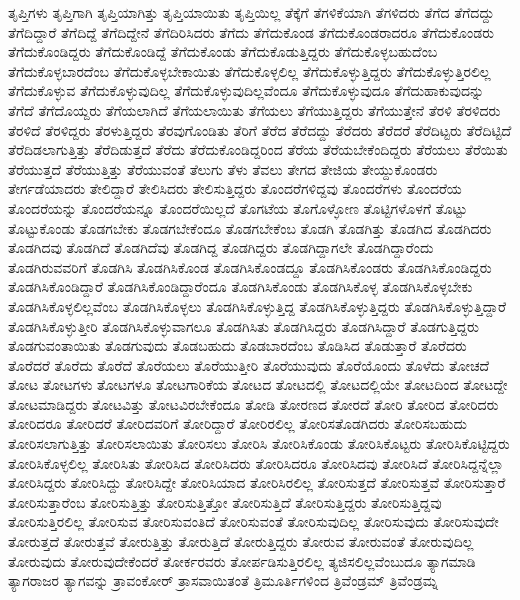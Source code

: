 {ತೃಪ್ತಿಗಳು
ತೃಪ್ತಿಗಾಗಿ
ತೃಪ್ತಿಯಾಗಿತ್ತು
ತೃಪ್ತಿಯಾಯಿತು
ತೃಪ್ತಿಯಿಲ್ಲ
ತೆಕ್ಕೆಗೆ
ತೆಗಳಿಕೆಯಾಗಿ
ತೆಗಳಿದರು
ತೆಗೆದ
ತೆಗೆದದ್ದು
ತೆಗೆದಿದ್ದಾರೆ
ತೆಗೆದಿದ್ದೆ
ತೆಗೆದಿದ್ದೇನೆ
ತೆಗೆದಿರಿಸಿದರು
ತೆಗೆದು
ತೆಗೆದುಕೊಂಡ
ತೆಗೆದುಕೊಂಡರಾದರೂ
ತೆಗೆದುಕೊಂಡರು
ತೆಗೆದುಕೊಂಡಿದ್ದರು
ತೆಗೆದುಕೊಂಡಿದ್ದೆ
ತೆಗೆದುಕೊಂಡು
ತೆಗೆದುಕೊಡುತ್ತಿದ್ದರು
ತೆಗೆದುಕೊಳ್ಳಬಹುದೆಂಬ
ತೆಗೆದುಕೊಳ್ಳಬಾರದೆಂಬ
ತೆಗೆದುಕೊಳ್ಳಬೇಕಾಯಿತು
ತೆಗೆದುಕೊಳ್ಳಲಿಲ್ಲ
ತೆಗೆದುಕೊಳ್ಳುತ್ತಿದ್ದರು
ತೆಗೆದುಕೊಳ್ಳುತ್ತಿರಲಿಲ್ಲ
ತೆಗೆದುಕೊಳ್ಳುವ
ತೆಗೆದುಕೊಳ್ಳುವುದಿಲ್ಲ
ತೆಗೆದುಕೊಳ್ಳುವುದಿಲ್ಲವೆಂದೂ
ತೆಗೆದುಕೊಳ್ಳುವುದೂ
ತೆಗೆದುಹಾಕುವುದನ್ನು
ತೆಗೆದೆ
ತೆಗೆದೊಯ್ದರು
ತೆಗೆಯಲಾಗಿದೆ
ತೆಗೆಯಲಾಯಿತು
ತೆಗೆಯಲು
ತೆಗೆಯುತ್ತಿದ್ದರು
ತೆಗೆಯುತ್ತೇನೆ
ತೆರಳಿ
ತೆರಳಿದರು
ತೆರಳಿದೆ
ತೆರಳಿದ್ದರು
ತೆರಳುತ್ತಿದ್ದರು
ತೆರವುಗೊಂಡಿತು
ತೆರಿಗೆ
ತೆರೆದ
ತೆರೆದದ್ದು
ತೆರೆದರು
ತೆರೆದರೆ
ತೆರೆದಿಟ್ಟರು
ತೆರೆದಿಟ್ಟಿದೆ
ತೆರೆದಿಡಲಾಗುತ್ತಿತ್ತು
ತೆರೆದಿಡುತ್ತದೆ
ತೆರೆದು
ತೆರೆದುಕೊಂಡಿದ್ದರಿಂದ
ತೆರೆಯ
ತೆರೆಯಬೇಕೆಂದಿದ್ದರು
ತೆರೆಯಲು
ತೆರೆಯಿತು
ತೆರೆಯುತ್ತದೆ
ತೆರೆಯುತ್ತಿತ್ತು
ತೆರೆಯುವಂತೆ
ತೆಲುಗು
ತೆಳು
ತೆವಲು
ತೇಗದ
ತೇಜಿಯ
ತೇಯ್ದುಕೊಂಡರು
ತೇರ್ಗಡೆಯಾದರು
ತೇಲಿದ್ದಾರೆ
ತೇಲಿಸಿದರು
ತೇಲಿಸುತ್ತಿದ್ದರು
ತೊಂದರೆಗಳಿದ್ದವು
ತೊಂದರೆಗಳು
ತೊಂದರೆಯ
ತೊಂದರೆಯನ್ನು
ತೊಂದರೆಯನ್ನೂ
ತೊಂದರೆಯಿಲ್ಲದೆ
ತೊಗಟೆಯ
ತೊಗೊಳ್ಳೋಣ
ತೊಟ್ಟಿಗಳೊಳಗೆ
ತೊಟ್ಟು
ತೊಟ್ಟುಕೊಂಡು
ತೊಡಗಬೇಕು
ತೊಡಗಬೇಕೆಂದೂ
ತೊಡಗಬೇಕೆಂಬ
ತೊಡಗಿ
ತೊಡಗಿತ್ತು
ತೊಡಗಿದ
ತೊಡಗಿದರು
ತೊಡಗಿದವು
ತೊಡಗಿದೆ
ತೊಡಗಿದೆವು
ತೊಡಗಿದ್ದ
ತೊಡಗಿದ್ದರು
ತೊಡಗಿದ್ದಾಗಲೇ
ತೊಡಗಿದ್ದಾರೆಂದು
ತೊಡಗಿರುವವರಿಗೆ
ತೊಡಗಿಸಿ
ತೊಡಗಿಸಿಕೊಂಡ
ತೊಡಗಿಸಿಕೊಂಡದ್ದೂ
ತೊಡಗಿಸಿಕೊಂಡರು
ತೊಡಗಿಸಿಕೊಂಡಿದ್ದರು
ತೊಡಗಿಸಿಕೊಂಡಿದ್ದಾರೆ
ತೊಡಗಿಸಿಕೊಂಡಿದ್ದಾರೆಂದೂ
ತೊಡಗಿಸಿಕೊಂಡು
ತೊಡಗಿಸಿಕೊಳ್ಳ
ತೊಡಗಿಸಿಕೊಳ್ಳಬೇಕು
ತೊಡಗಿಸಿಕೊಳ್ಳಲಿಲ್ಲವೆಂಬ
ತೊಡಗಿಸಿಕೊಳ್ಳಲು
ತೊಡಗಿಸಿಕೊಳ್ಳುತ್ತಿದ್ದ
ತೊಡಗಿಸಿಕೊಳ್ಳುತ್ತಿದ್ದರು
ತೊಡಗಿಸಿಕೊಳ್ಳುತ್ತಿದ್ದಾರೆ
ತೊಡಗಿಸಿಕೊಳ್ಳುತ್ತೀರಿ
ತೊಡಗಿಸಿಕೊಳ್ಳುವಾಗಲೂ
ತೊಡಗಿಸಿತು
ತೊಡಗಿಸಿದ್ದರು
ತೊಡಗಿಸಿದ್ದಾರೆ
ತೊಡಗುತ್ತಿದ್ದರು
ತೊಡಗುವಂತಾಯಿತು
ತೊಡಗುವುದು
ತೊಡಬಹುದು
ತೊಡಬಾರದೆಂಬ
ತೊಡಿಸಿದ
ತೊಡುತ್ತಾರೆ
ತೊರೆದರು
ತೊರೆದರೆ
ತೊರೆದು
ತೊರೆದೆ
ತೊರೆಯಲು
ತೊರೆಯುತ್ತೀರಿ
ತೊರೆಯುವುದು
ತೊರೆಯೊಂದು
ತೊಳೆದು
ತೋಚದೆ
ತೋಟ
ತೋಟಗಳು
ತೋಟಗಳೂ
ತೋಟಗಾರಿಕೆಯ
ತೋಟದ
ತೋಟದಲ್ಲಿ
ತೋಟದಲ್ಲಿಯೇ
ತೋಟದಿಂದ
ತೋಟದ್ದೇ
ತೋಟಮಾಡಿದ್ದರು
ತೋಟವಿತ್ತು
ತೋಟವಿರಬೇಕೆಂದೂ
ತೋಡಿ
ತೋರಣದ
ತೋರದೆ
ತೋರಿ
ತೋರಿದ
ತೋರಿದರು
ತೋರಿದರೂ
ತೋರಿದರೆ
ತೋರಿದವರಿಗೆ
ತೋರಿದ್ದಾರೆ
ತೋರಿರಲಿಲ್ಲ
ತೋರಿಸತೊಡಗಿದರು
ತೋರಿಸಬಹುದು
ತೋರಿಸಲಾಗುತ್ತಿತ್ತು
ತೋರಿಸಲಾಯಿತು
ತೋರಿಸಲು
ತೋರಿಸಿ
ತೋರಿಸಿಕೊಂಡು
ತೋರಿಸಿಕೊಟ್ಟರು
ತೋರಿಸಿಕೊಟ್ಟಿದ್ದರು
ತೋರಿಸಿಕೊಳ್ಳಲಿಲ್ಲ
ತೋರಿಸಿತು
ತೋರಿಸಿದ
ತೋರಿಸಿದರು
ತೋರಿಸಿದರೂ
ತೋರಿಸಿದವು
ತೋರಿಸಿದೆ
ತೋರಿಸಿದ್ದನ್ನೆಲ್ಲಾ
ತೋರಿಸಿದ್ದರು
ತೋರಿಸಿದ್ದು
ತೋರಿಸಿದ್ದೇ
ತೋರಿಸಿಯಾದ
ತೋರಿಸಿರಲಿಲ್ಲ
ತೋರಿಸುತ್ತದೆ
ತೋರಿಸುತ್ತವೆ
ತೋರಿಸುತ್ತಾರೆ
ತೋರಿಸುತ್ತಾರೆಂಬ
ತೋರಿಸುತ್ತಿತ್ತು
ತೋರಿಸುತ್ತಿತ್ತೋ
ತೋರಿಸುತ್ತಿದೆ
ತೋರಿಸುತ್ತಿದ್ದರು
ತೋರಿಸುತ್ತಿದ್ದವು
ತೋರಿಸುತ್ತಿರಲಿಲ್ಲ
ತೋರಿಸುವ
ತೋರಿಸುವಂತಿದೆ
ತೋರಿಸುವಂತೆ
ತೋರಿಸುವುದಿಲ್ಲ
ತೋರಿಸುವುದು
ತೋರಿಸುವುದೇ
ತೋರುತ್ತದೆ
ತೋರುತ್ತವೆ
ತೋರುತ್ತಿತ್ತು
ತೋರುತ್ತಿದೆ
ತೋರುತ್ತಿದ್ದರು
ತೋರುವ
ತೋರುವಂತೆ
ತೋರುವುದಿಲ್ಲ
ತೋರುವುದು
ತೋರುವುದೇಕೆಂದರೆ
ತೋರ್ಕರವರು
ತೋರ್ಪಡಿಸುತ್ತಿರಲಿಲ್ಲ
ತ್ಯಜಿಸಲಿಲ್ಲವೆಂಬುದೂ
ತ್ಯಾಗಮಾಡಿ
ತ್ಯಾಗರಾಜರ
ತ್ಯಾಗವನ್ನು
ತ್ರಾವಂಕೋರ್
ತ್ರಾಸವಾಯಿತಂತೆ
ತ್ರಿಮೂರ್ತಿಗಳಿಂದ
ತ್ರಿವೆಂಡ್ರಮ್
ತ್ರಿವೆಂಡ್ರಮ್ನ
}
